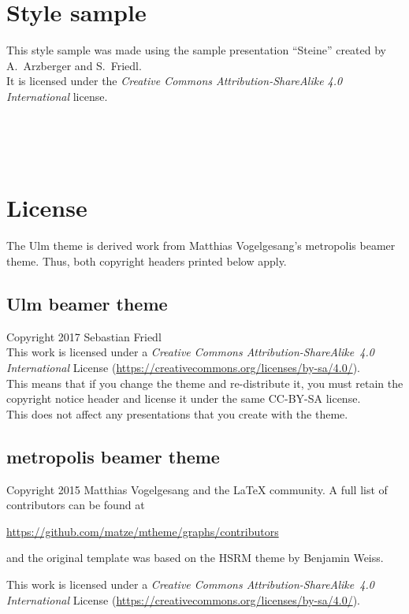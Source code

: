 \documentclass[12pt,a4paper]{scrartcl}
\begin{document}
	\section{Style sample}
	This style sample was made using the sample presentation \enquote{Steine} created by A.~Arzberger and S.~Friedl. \\
	It is licensed under the \textit{Creative Commons Attribution-ShareAlike 4.0 International} license.
	\begin{center}
		  \\
		  \\
		  \\
		 
	\end{center}

	
	\section{License}
	The Ulm theme is derived work from Matthias Vogelgesang's metropolis beamer theme. Thus, both copyright headers printed below apply.
	
	\subsection*{Ulm beamer theme}
	Copyright 2017 Sebastian Friedl \\
	This work is licensed under a \textit{Creative Commons Attribution-ShareAlike~4.0 International} License (\url{https://creativecommons.org/licenses/by-sa/4.0/}). \\
	This means that if you change the theme and re-distribute it, you must retain the copyright notice header and license it under the same CC-BY-SA license. \\
	This does not affect any presentations that you create with the theme.
	
	\subsection*{metropolis beamer theme}
	Copyright 2015 Matthias Vogelgesang and the LaTeX community. A full list of contributors can be found at
	\begin{center}
		\url{https://github.com/matze/mtheme/graphs/contributors}
	\end{center}
	and the original template was based on the HSRM theme by Benjamin Weiss.

	This work is licensed under a \textit{Creative Commons Attribution-ShareAlike~4.0 International} License (\url{https://creativecommons.org/licenses/by-sa/4.0/}).
\end{document}
